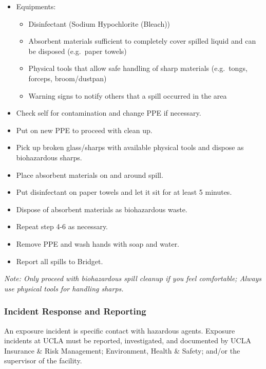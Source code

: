 \documentclass[]{book}
\providecommand{\tightlist}{%
  \setlength{\itemsep}{0pt}\setlength{\parskip}{0pt}}
\begin{document}
\begin{itemize}
\tightlist
\item
  Equipments:

  \begin{itemize}
  \tightlist
  \item
    Disinfectant (Sodium Hypochlorite (Bleach))
  \item
    Absorbent materials sufficient to completely cover spilled liquid and can be disposed (e.g.~paper towels)
  \item
    Physical tools that allow safe handling of sharp materials (e.g.~tongs, forceps, broom/dustpan)
  \item
    Warning signs to notify others that a spill occurred in the area
  \end{itemize}
\item
  Check self for contamination and change PPE if necessary.
\item
  Put on new PPE to proceed with clean up.
\item
  Pick up broken glass/sharps with available physical tools and dispose as biohazardous sharps.
\item
  Place absorbent materials on and around spill.
\item
  Put disinfectant on paper towels and let it sit for at least 5 minutes.
\item
  Dispose of absorbent materials as biohazardous waste.
\item
  Repeat step 4-6 as necessary.
\item
  Remove PPE and wash hands with soap and water.
\item
  Report all spills to Bridget.
\end{itemize}

\emph{Note: Only proceed with biohazardous spill cleanup if you feel comfortable;
Always use physical tools for handling sharps.}

\hypertarget{incident-response-and-reporting}{%
\subsubsection{Incident Response and Reporting}\label{incident-response-and-reporting}}

An exposure incident is specific contact with hazardous agents. Exposure incidents at UCLA must be reported, investigated, and documented by UCLA Insurance \& Risk Management; Environment, Health \& Safety; and/or the supervisor of the facility.
\end{document}
